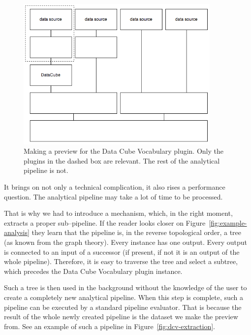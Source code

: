 \begin{figure}
	\centering
	\includegraphics[width=100mm]{img/dcv-preview-useful.png}
	\caption{Making a preview for the Data Cube Vocabulary plugin. Only the plugins in
	the dashed box are relevant. The rest of the analytical pipeline is not.}
	\label{fig:dcv-preview-useful}
\end{figure}

It brings on not only a technical complication, it also rises a performance 
question. The analytical pipeline may take a lot of time to be processed.

That is why we had to introduce a mechanism, which, in the right moment, 
extracts a proper sub--pipeline. If the reader looks closer on 
Figure~\ref{fig:example-analysis} they learn that the pipeline is,
in the reverse topological order, 
a tree (as known from the graph theory). Every instance has 
one output. Every output is connected to an input of a successor (if present, if not it is an output
of the whole pipeline). Therefore, it is easy to traverse the tree and select a 
subtree, which precedes the Data Cube Vocabulary plugin instance.

Such a tree is then used in the background without the knowledge of the user to 
create a completely new analytical pipeline. When this step is complete, such a pipeline can 
be executed by a standard pipeline evaluator. That is because the result of the whole 
newly created pipeline is the dataset we make the preview from.
See an example of such a pipeline in Figure~\ref{fig:dcv-extraction}.

